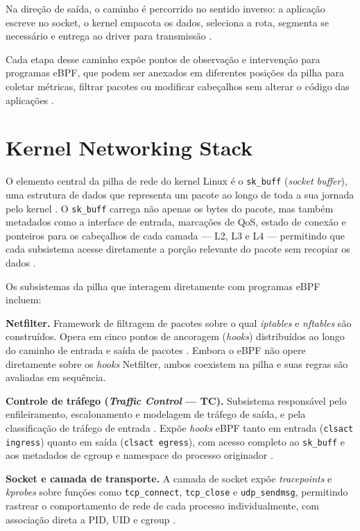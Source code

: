 Na direção de saída, o caminho é percorrido no sentido inverso: a aplicação escreve
no socket, o kernel empacota os dados, seleciona a rota, segmenta se necessário e
entrega ao driver para transmissão \cite{gregg2019}.

Cada etapa desse caminho expõe pontos de observação e intervenção para programas
eBPF, que podem ser anexados em diferentes posições da pilha para coletar métricas,
filtrar pacotes ou modificar cabeçalhos sem alterar o código das aplicações
\cite{linuxkernel2024}.

\section{Kernel Networking Stack}

O elemento central da pilha de rede do kernel Linux é o \texttt{sk\_buff}
(\textit{socket buffer}), uma estrutura de dados que representa um pacote ao longo
de toda a sua jornada pelo kernel \cite{linuxkernel2024}.
O \texttt{sk\_buff} carrega não apenas os bytes do pacote, mas também metadados
como a interface de entrada, marcações de QoS, estado de conexão e ponteiros para
os cabeçalhos de cada camada --- L2, L3 e L4 --- permitindo que cada subsistema
acesse diretamente a porção relevante do pacote sem recopiar os dados
\cite{gregg2020}.

Os subsistemas da pilha que interagem diretamente com programas eBPF incluem:

\textbf{Netfilter.}
Framework de filtragem de pacotes sobre o qual \textit{iptables} e \textit{nftables}
são construídos.
Opera em cinco pontos de ancoragem (\textit{hooks}) distribuídos ao longo do caminho
de entrada e saída de pacotes \cite{linuxkernel2024}.
Embora o eBPF não opere diretamente sobre os \textit{hooks} Netfilter, ambos
coexistem na pilha e suas regras são avaliadas em sequência.

\textbf{Controle de tráfego (\textit{Traffic Control} --- TC).}
Subsistema responsável pelo enfileiramento, escalonamento e modelagem de tráfego
de saída, e pela classificação de tráfego de entrada \cite{linuxkernel2024}.
Expõe \textit{hooks} eBPF tanto em entrada (\texttt{clsact ingress}) quanto em
saída (\texttt{clsact egress}), com acesso completo ao \texttt{sk\_buff} e aos
metadados de cgroup e namespace do processo originador \cite{cassagnes2020}.

\textbf{Socket e camada de transporte.}
A camada de socket expõe \textit{tracepoints} e \textit{kprobes} sobre funções
como \texttt{tcp\_connect}, \texttt{tcp\_close} e \texttt{udp\_sendmsg}, permitindo
rastrear o comportamento de rede de cada processo individualmente, com associação
direta a PID, UID e cgroup \cite{gregg2019}.

